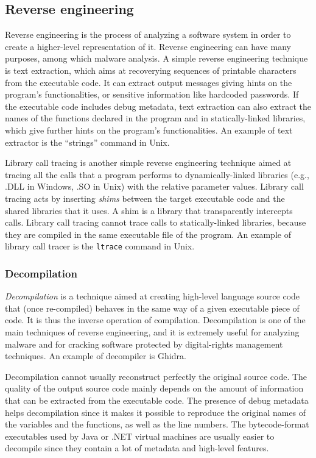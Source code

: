 \documentclass[a4paper,12pt]{article}
\begin{document}
\subsection{Reverse engineering}
Reverse engineering is the process of analyzing a software system in order to create a higher-level representation of it. Reverse engineering can have many purposes, among which malware analysis.
A simple reverse engineering technique is text extraction, which aims at recoverying sequences of printable characters from the executable code. It can extract output messages giving hints on the program’s functionalities, or sensitive information like hardcoded passwords. If the executable code includes debug metadata, text extraction can also extract the names of the functions declared in the program and in statically-linked libraries, which give further hints on the program’s functionalities. An example of text extractor is the “strings” command in Unix.

Library call tracing is another simple reverse engineering technique aimed at tracing all the calls that a program performs to dynamically-linked libraries (e.g., .DLL in Windows, .SO in Unix) with the relative parameter values. Library call tracing acts by inserting \textit{shims} between the target executable code and the shared libraries that it uses. A shim is a library that transparently intercepts calls. Library call tracing cannot trace calls to statically-linked libraries, because they are compiled in the same executable file of the program. An example of library call tracer is the \texttt{ltrace} command in Unix.

\subsubsection{Decompilation}
\textit{Decompilation} is a technique aimed at creating high-level language source code that (once re-compiled) behaves in the same way of a given executable piece of code. It is thus the inverse operation of compilation. Decompilation is one of the main techniques of reverse engineering, and it is extremely useful for analyzing malware and for cracking software protected by digital-rights management techniques. An example of decompiler is Ghidra.

Decompilation cannot usually reconstruct perfectly the original source code. The quality of the output source code mainly depends on the amount of information that can be extracted from the executable code. The presence of debug metadata helps decompilation since it makes it possible to reproduce the original names of the variables and the functions, as well as the line numbers. The bytecode-format executables used by Java or .NET virtual machines are usually easier to decompile since they contain a lot of metadata and high-level features.
\end{document}
